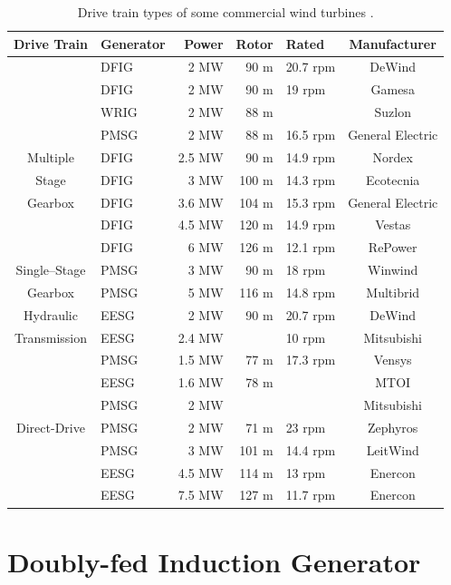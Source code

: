 \documentclass[a4paper, 11pt]{article} %
\begin{document}
\begin{table}[t]
  \centering
  \begin{tabular}{clrrlc}
	  
	  Drive Train & Generator & Power & Rotor & Rated & Manufacturer \\
	  \hline
		& DFIG & 2 MW & 90 m & 20.7 rpm & DeWind \\
		& DFIG & 2 MW & 90 m & 19 rpm & Gamesa \\
	  	& WRIG & 2 MW & 88 m &  & Suzlon \\
	  	& PMSG & 2 MW & 88 m & 16.5 rpm & General Electric \\
	 Multiple 	& DFIG & 2.5 MW & 90 m & 14.9 rpm & Nordex \\
	Stage  	& DFIG & 3 MW & 100 m & 14.3 rpm & Ecotecnia \\
  	Gearbox & DFIG & 3.6 MW & 104 m & 15.3 rpm & General Electric \\
	  	& DFIG & 4.5 MW & 120 m & 14.9 rpm & Vestas \\
	  	& DFIG & 6 MW & 126 m & 12.1 rpm & RePower \\
	  	\hline
	Single--Stage  	& PMSG & 3 MW & 90 m & 18 rpm & Winwind \\
	Gearbox  	& PMSG & 5 MW & 116 m & 14.8 rpm & Multibrid \\
	  	\hline
	 Hydraulic 	& EESG & 2 MW & 90 m & 20.7 rpm & DeWind \\
	 Transmission 	& EESG & 2.4 MW &  & 10 rpm & Mitsubishi \\
	  	\hline
	  	& PMSG & 1.5 MW & 77 m & 17.3 rpm & Vensys \\
	  	& EESG & 1.6 MW & 78 m &  & MTOI \\
	  	& PMSG & 2 MW &  &  & Mitsubishi \\
	Direct-Drive  	& PMSG & 2 MW & 71 m & 23 rpm & Zephyros \\
	  	& PMSG & 3 MW & 101 m & 14.4 rpm & LeitWind \\
	  	& EESG & 4.5 MW & 114 m & 13 rpm & Enercon \\
	  	& EESG & 7.5 MW & 127 m & 11.7 rpm & Enercon \\
	  \hline

  \end{tabular}
  \caption{Drive train types of some commercial wind turbines \cite{wind_energy_facts,upwind2011}.}
  \label{generator_manufacturers}
\end{table}

\section{Doubly-fed Induction Generator}
\end{document}
